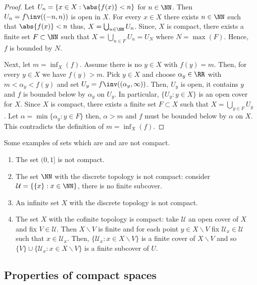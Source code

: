 \documentclass[12pt, a4paper]{article}
\begin{document}
\begin{proof}
    Let \(U_n = \{x \in X : \abs{f(x)}<n\}\) for \(n \in \NN\). Then \(U_n = f\inv((-n,n))\) is open in \(X\). For every \(x \in X\) there exists \(n \in \NN\) such that \(\abs{f(x)}<n\) thus, \(X = \bigcup_{n\in \NN} U_n\). Since, \(X\) is compact, there exists a finite set \(F \subset \NN\) such that \(X = \bigcup_{n \in F} U_n =U_N\) where \(N =\max(F)\). Hence, \(f\) is bounded by \(N\).
    
    Next, let \(m=\inf_X(f)\). Assume there is no \(y \in X\) with \(f(y)=m\). Then, for every \(y \in X\) we have \(f(y)>m\). Pick \(y \in X\) and choose \(\alpha_y \in \RR\) with \(m<\alpha_y<f(y)\) and set \(U_y=f\inv((\alpha_y,\infty))\). Then, \(U_y\) is open, it contains \(y\) and \(f\) is bounded below by \(\alpha_y\) on \(U_y\). In particular, \(\{U_y : y\in X\}\) is an open cover for \(X\). Since \(X\) is compact, there exists a finite set \(F \subset X\) such that \(X = \bigcup_{y \in F} U_y\). Let \(\alpha =\min\{\alpha_y :y \in F\}\) then, \(\alpha>m\) and \(f\) must be bounded below by \(\alpha\) on \(X\). This contradicts the definition of \(m = \inf_X(f)\).
\end{proof}

\begin{mdexample}
    Some examples of sets which are and are not compact.
    \begin{enumerate}
        \item The set \((0,1]\) is not compact.
        \item The set \(\NN\) with the discrete topology is not compact: consider \(\mathcal{U}=\{\{x\} : x \in \NN\}\), there is no finite subcover.
        \item An infinite set \(X\) with the discrete topology is not compact.
        \item The set \(X\) with the cofinite topology is compact: take \(\mathcal{U}\) an open cover of \(X\) and fix \(V \in \mathcal{U}\). Then \(X \backslash V\) is finite and for each point \(y \in X\backslash V\) fix \(\mathcal{U}_x \in \mathcal{U}\) such that \(x \in \mathcal{U}_x\). Then, \(\{\mathcal{U}_x : x \in X\backslash V\}\) is a finite cover of \(X \backslash V\) and so \(\{V\}\cup \{\mathcal{U}_x : x \in X \backslash V\}\) is a finite subcover of \(U\).
    \end{enumerate}
\end{mdexample}

\subsection{Properties of compact spaces}
\end{document}
